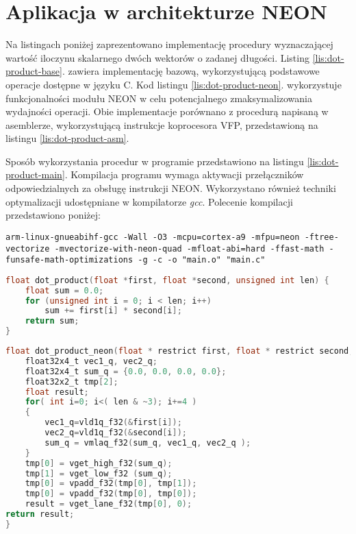 \section{Aplikacja w architekturze NEON}
\label{cha:neon-source}



Na listingach poniżej zaprezentowano implementację procedury wyznaczającej wartość iloczynu skalarnego dwóch wektorów o zadanej długości. 
Listing \ref{lis:dot-product-base}. zawiera implementację bazową, wykorzystującą podstawowe operacje dostępne w języku C.
Kod listingu \ref{lis:dot-product-neon}. wykorzystuje funkcjonalności modułu NEON w celu potencjalnego zmaksymalizowania wydajności operacji. 
Obie implementacje porównano z procedurą napisaną w asemblerze, wykorzystującą instrukcje koprocesora VFP, przedstawioną na listingu \ref{lis:dot-product-asm}.

Sposób wykorzystania procedur w programie przedstawiono na listingu \ref{lis:dot-product-main}. 
Kompilacja programu wymaga aktywacji przełączników odpowiedzialnych za obsługę instrukcji NEON. 
Wykorzystano również techniki optymalizacji udostępniane w kompilatorze \textit{gcc}. 
Polecenie kompilacji przedstawiono poniżej:

\begin{lstlisting}[breaklines=true]
arm-linux-gnueabihf-gcc -Wall -O3 -mcpu=cortex-a9 -mfpu=neon -ftree-vectorize -mvectorize-with-neon-quad -mfloat-abi=hard -ffast-math -funsafe-math-optimizations -g -c -o "main.o" "main.c"
\end{lstlisting}

\begin{lstlisting}[breaklines=true, language=C, caption=Implementacja bazowa., label=lis:dot-product-base]
float dot_product(float *first, float *second, unsigned int len) {
	float sum = 0.0;
	for (unsigned int i = 0; i < len; i++)
		sum += first[i] * second[i];
	return sum;
}
\end{lstlisting}

\begin{lstlisting}[breaklines=true, language=C, caption=Implementacja w architekturze NEON. (Źródło: \cite{xilinx-neon}), label=lis:dot-product-neon]
float dot_product_neon(float * restrict first, float * restrict second, unsigned int len) {
	float32x4_t vec1_q, vec2_q;
	float32x4_t sum_q = {0.0, 0.0, 0.0, 0.0};
	float32x2_t tmp[2];
	float result;
	for( int i=0; i<( len & ~3); i+=4 )
	{
		vec1_q=vld1q_f32(&first[i]);
		vec2_q=vld1q_f32(&second[i]);
		sum_q = vmlaq_f32(sum_q, vec1_q, vec2_q );
	}
	tmp[0] = vget_high_f32(sum_q);
	tmp[1] = vget_low_f32 (sum_q);
	tmp[0] = vpadd_f32(tmp[0], tmp[1]);
	tmp[0] = vpadd_f32(tmp[0], tmp[0]);
	result = vget_lane_f32(tmp[0], 0);
return result;
}
\end{lstlisting}


